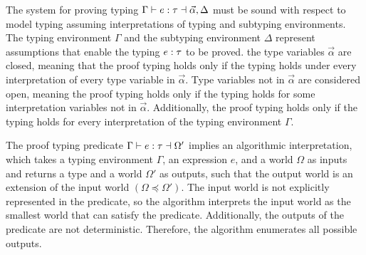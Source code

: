 \documentclass[acmsmall]{acmart}
\theoremstyle{definition}
\begin{document}
The system for proving typing $\Gamma \vdash e : \tau \dashv \vec{\alpha}, \Delta$ 
must be sound with respect to model typing assuming 
interpretations of typing and subtyping environments.
The typing environment $\Gamma$ and the subtyping environment $\Delta$
represent assumptions that enable the typing $e : \tau$ to be proved. 
the type variables $\vec{\alpha}$ are closed, meaning that the proof typing
holds only if the typing holds under every interpretation of every type variable in $\vec{\alpha}$.
Type variables not in $\vec{\alpha}$ are considered open, meaning the proof typing
holds only if the typing holds for some interpretation variables not in $\vec{\alpha}$.
Additionally, the proof typing holds only if the typing holds for every interpretation of
the typing environment $\Gamma$.

The proof typing predicate $\Gamma \vdash e : \tau \dashv \Omega'$
implies an algorithmic interpretation, 
which takes a typing environment $\Gamma$, an expression $e$,
and a world $\Omega$ as inputs and returns a type and a world $\Omega'$ as outputs,
such that the output world is an extension of the input world $(\Omega \preceq \Omega')$.
The input world is not explicitly represented in the predicate, so the algorithm
interprets the input world as the smallest world that can satisfy the predicate. 
Additionally, the outputs of the predicate are not deterministic. Therefore, the algorithm
enumerates all possible outputs.
\end{document}
